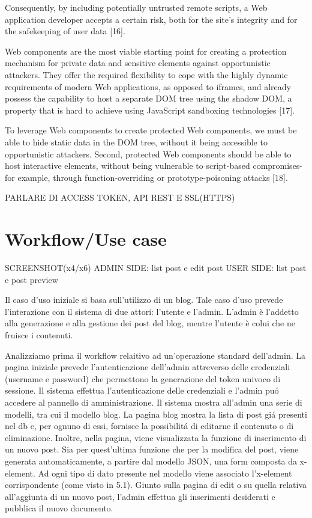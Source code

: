 \documentclass{sig-alternate}
\begin{document}
Consequently, by including potentially untrusted remote scripts, a Web application developer accepts a certain risk, both for the site's integrity and for the safekeeping of user data [16].

Web components are the most viable starting point for creating a protection mechanism for private data and sensitive elements against opportunistic attackers. They offer the required flexibility to cope with the highly dynamic requirements of modern Web applications, as opposed to iframes, and already possess the capability to host a separate DOM tree using the shadow DOM, a property that is hard to achieve using JavaScript sandboxing technologies [17].

To leverage Web components to create protected Web components, we must be able to hide static data in the DOM tree, without it being accessible to opportunistic attackers. Second, protected Web components should be able to host interactive elements, without being vulnerable to script-based compromises-for example, through function-overriding or prototype-poisoning attacks [18].

PARLARE DI ACCESS TOKEN, API REST E SSL(HTTPS)

\section{Workflow/Use case}
SCREENSHOT(x4/x6)
	ADMIN SIDE: list post e edit post
	USER SIDE: list post e post preview

Il caso d'uso iniziale si basa sull'utilizzo di un blog. Tale caso d'uso prevede l'interazione con il sistema di due attori: l'utente e l'admin.
L'admin \`e l'addetto alla generazione e alla gestione dei post del blog, mentre l'utente \`e colui che ne fruisce i contenuti.

Analizziamo prima il workflow relaitivo ad un'operazione standard dell'admin.
La pagina iniziale prevede l'autenticazione dell'admin attreverso delle credenziali (username e password) che permettono la generazione del token univoco di sessione. Il sistema effettua l'autenticazione delle credenziali e l'admin pu\'o accedere al pannello di amministrazione. Il sistema mostra all'admin una serie di modelli, tra cui il modello blog. La pagina blog mostra la lista di post gi\'a presenti nel db e, per ognuno di essi, fornisce la possibilit\'a di editarne il contenuto o di eliminazione.
Inoltre, nella pagina, viene visualizzata la funzione di inserimento di un nuovo post.
Sia per quest'ultima funzione che per la modifica del post, viene generata automaticamente, a partire dal modello JSON, una form composta da x-element. Ad ogni tipo di dato presente nel modello viene associato l'x-element corrispondente (come visto in 5.1).
Giunto sulla pagina di edit o su quella relativa all'aggiunta di un nuovo post, l'admin effettua gli inserimenti desiderati e pubblica il nuovo documento.
\end{document}
